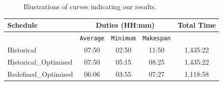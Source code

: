 \begin{figure}%
    \centering
    \qquad
    \centering
    \caption{Illustrations of curves indicating our results.}%
    \label{fig:1-D2M1}%
\end{figure}
 

\begin{table}[h]
\small
    \centering 
    \begin{tabular}{|l|c|c|c|c|}
        \hline
        \textbf{Schedule} & \multicolumn{3}{|c|}{ \textbf{Duties (HH:mm)}} & \textbf{Total Time}  \\
        \hline
         & \texttt{Average} &  \texttt{Minimum} & \texttt{Makespan} & \\
        \hline
        Historical  & 07:50 & 02:50 & 11:50 & 1,435:22 \\
        \hline
        Historical\_Optimised   & 07:50 & 05:15 & 08:25 & 1,435:22 \\
        \hline
        Redefined\_Optimised   & 06:06 & 03:55 & 07:27 & 1,118:58 \\
        \hline
    \end{tabular}%
    \medbreak
\end{table}
 
